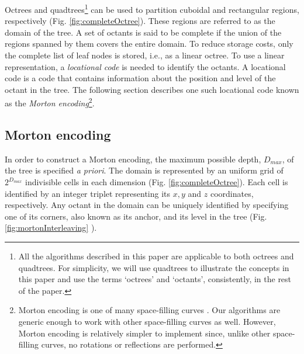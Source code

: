 Octrees and quadtrees\footnote{All the algorithms described in this
paper are applicable to both octrees and quadtrees. For simplicity, we
will use quadtrees to illustrate the concepts in this paper and use
the terms `octrees' and `octants', consistently, in the rest of the
paper.} can be used to partition cuboidal and rectangular regions,
respectively (Fig. \ref{fig:completeOctree}).  These regions are
referred to as the domain of the tree. A set of octants is said to be
complete if the union of the regions spanned by them covers the entire
domain. To reduce storage costs, only the complete list of leaf nodes
is stored, i.e., as a linear octree. To use a linear representation, a
{\em locational code} is needed to identify the octants.  A locational
code is a code that contains information about the position and level
of the octant in the tree. The following section describes one such
locational code known as the {\em Morton encoding}\footnote{Morton
encoding is one of many space-filling curves \cite{zoltan}. Our
algorithms are generic enough to work with other space-filling curves
as well. However, Morton encoding is relatively simpler to implement
since, unlike other space-filling curves, no rotations or reflections
are performed.}.

\subsection{Morton encoding} \label{sec:morton}
 In order to construct a Morton encoding, the maximum possible depth,
$D_{max}$, of the tree is specified {\em a priori}. The domain is
represented by an uniform grid of $2^{D_{max}}$ indivisible cells in
each dimension (Fig. \ref{fig:completeOctree}). Each cell is
identified by an integer triplet representing its $x,y$ and $z$
coordinates, respectively. Any octant in the domain can be uniquely
identified by specifying one of its corners, also known as its anchor,
and its level in the tree (Fig. \ref{fig:mortonInterleaving} ).

